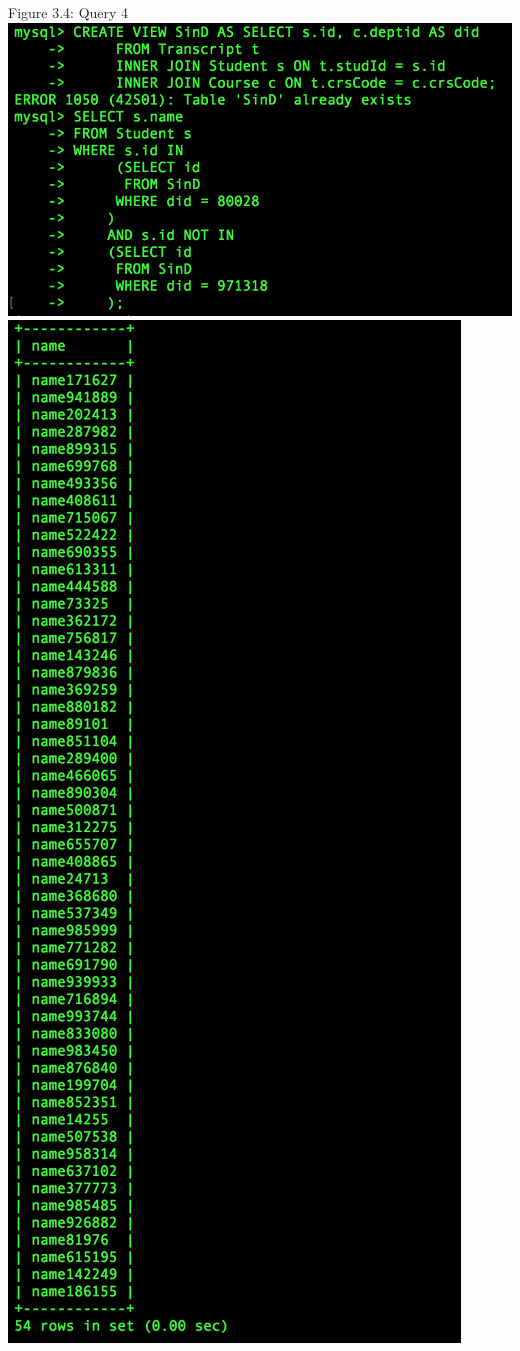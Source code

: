 \documentclass[11pt]{report}
\begin{document}
\begin{center}
			Figure 3.4: Query 4\\
			\includegraphics[scale=0.35]{a5-1.PNG}\\
			\includegraphics[scale=0.395]{a5-2.PNG}\\

\end{center}
\end{document}
